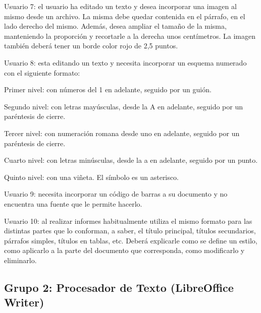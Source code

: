 \documentclass[12pt]{article}
\begin{document}
\begin{description}
    \item{Usuario 7}: el usuario ha editado un texto y desea incorporar una
    imagen al mismo desde un archivo. La misma debe quedar contenida en el
    párrafo, en el lado derecho del mismo. Además, desea ampliar el tamaño de
    la misma, manteniendo la proporción y recortarle a la derecha unos
    centímetros. La imagen también deberá tener un borde color rojo de 2,5
    puntos.

    \item{Usuario 8}: esta editando un texto y necesita incorporar un esquema
    numerado con el siguiente formato:

    \begin{description}

        \item{Primer nivel}: con números del 1 en adelante, seguido por un
        guión.

        \item{Segundo nivel}: con letras mayúsculas, desde la A en adelante,
        seguido por un paréntesis de cierre.

        \item{Tercer nivel}: con numeración romana desde uno en adelante,
        seguido por un paréntesis de cierre.

        \item{Cuarto nivel}: con letras minúsculas, desde la a en adelante,
        seguido por un punto.

        \item{Quinto nivel}: con una viñeta. El símbolo es un asterisco.

    \end{description}

    \item{Usuario 9}: necesita incorporar un código de barras a su documento y
    no encuentra una fuente que le permite hacerlo.

    \item{Usuario 10}: al realizar informes habitualmente utiliza el mismo
    formato para las distintas partes que lo conforman, a saber, el título
    principal, títulos secundarios, párrafos simples, títulos en tablas, etc.
    Deberá explicarle como se define un estilo, como aplicarlo a la parte del
    documento que corresponda, como modificarlo y eliminarlo.

\end{description}

\subsection*{Grupo 2: Procesador de Texto (LibreOffice Writer)}
\end{document}
